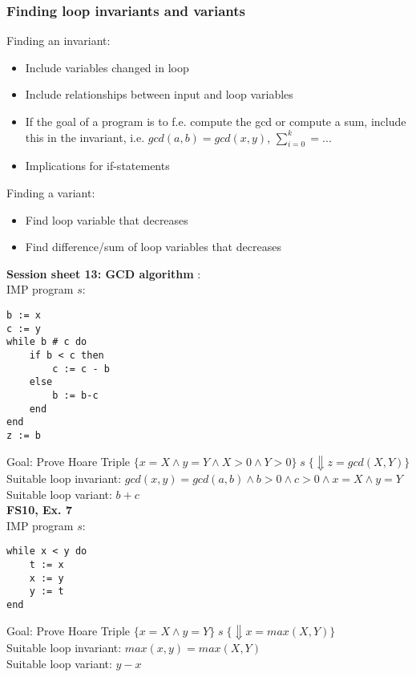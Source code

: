\documentclass[11.5pt]{article}
\begin{document}
\subsubsection{Finding loop invariants and variants}
Finding an invariant: \begin{itemize}
    \item Include variables changed in loop
    \item Include relationships between input and loop variables
    \item If the goal of a program is to f.e. compute the gcd or compute a sum, include
    this in the invariant, i.e. $gcd(a,b)=gcd(x,y)$, $\sum_{i=0}^{k}=...$
    \item Implications for if-statements
\end{itemize}
Finding a variant:
\begin{itemize}
    \item Find loop variable that decreases
    \item Find difference/sum of loop variables that decreases
\end{itemize}
\smallskip
\textbf{Session sheet 13: GCD algorithm }: \\
IMP program $s$:
\begin{verbatim}
b := x
c := y
while b # c do
    if b < c then
        c := c - b
    else
        b := b-c
    end
end
z := b
\end{verbatim}
Goal: Prove Hoare Triple 
$\{x=X \land y=Y\land X > 0 \land Y >0\} \; s \; \{\Downarrow z=gcd(X,Y)\}$
Suitable loop invariant: $gcd(x,y)=gcd(a,b) \land b >0 \land c > 0 \land x=X \land y=Y$ \\
Suitable loop variant: $b+c$ \smallskip \\
\textbf{FS10, Ex. 7} \\
IMP program $s$:
\begin{verbatim}
while x < y do
    t := x
    x := y
    y := t
end
\end{verbatim}
Goal: Prove Hoare Triple $\{x=X \land y=Y\} \; s \; \{\Downarrow x = max(X,Y)\}$ \\
Suitable loop invariant: $max(x,y)=max(X,Y)$ \\
Suitable loop variant: $y-x$ 
\end{document}
